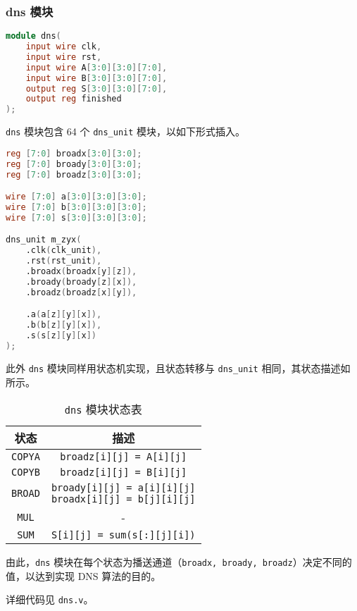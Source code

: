 \documentclass{zjureport-zh}
\begin{document}
\newpage
\subsubsection{dns 模块}
\begin{lstlisting}[language=verilog]
module dns(
	input wire clk,
	input wire rst,
	input wire A[3:0][3:0][7:0],
	input wire B[3:0][3:0][7:0],
	output reg S[3:0][3:0][7:0],
	output reg finished
);
\end{lstlisting}
\par \texttt{dns} 模块包含 64 个 \texttt{dns\_unit} 模块，以如下形式插入。
\begin{lstlisting}[language=verilog]
reg [7:0] broadx[3:0][3:0];
reg [7:0] broady[3:0][3:0];
reg [7:0] broadz[3:0][3:0];

wire [7:0] a[3:0][3:0][3:0];
wire [7:0] b[3:0][3:0][3:0];
wire [7:0] s[3:0][3:0][3:0];

dns_unit m_zyx(
	.clk(clk_unit),
	.rst(rst_unit),
	.broadx(broadx[y][z]),
	.broady(broady[z][x]),
	.broadz(broadz[x][y]),

	.a(a[z][y][x]),
	.b(b[z][y][x]),
	.s(s[z][y][x])
);
\end{lstlisting}

\par 此外 \texttt{dns} 模块同样用状态机实现，且状态转移与 \texttt{dns\_unit} 相同，其状态描述如 所示。

\begin{table}[h]
	\centering
	\caption{\texttt{dns} 模块状态表} \label{dns_statetab}
	\vspace{1ex}
	\begin{tabular}{cc}
		\hline
		状态 & 描述 \\
		\hline
		\texttt{COPYA} & \texttt{broadz[i][j] = A[i][j]} \\
		\hline
		\texttt{COPYB} & \texttt{broadz[i][j] = B[i][j]} \\
		\hline
		\texttt{BROAD} & \makecell{\texttt{broady[i][j] = a[i][i][j]} \\ \texttt{broadx[i][j] = b[j][i][j]}} \\
		\hline
		\texttt{MUL} & - \\
		\hline
		\texttt{SUM} & \texttt{S[i][j] = sum(s[:][j][i])} \\
		\hline
	\end{tabular}
\end{table}

\par 由此，\texttt{dns} 模块在每个状态为播送通道（\texttt{broadx, broady, broadz}）决定不同的值，以达到实现 DNS 算法的目的。
\par 详细代码见 \texttt{dns.v}。
\end{document}
